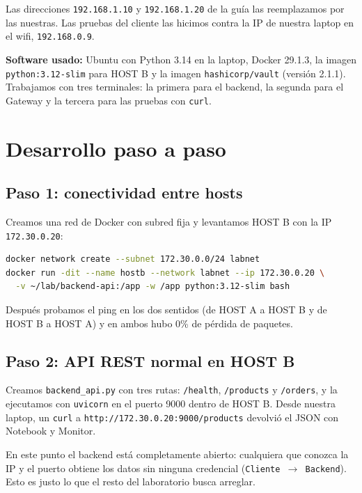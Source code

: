 \documentclass[11pt,a4paper]{article}
\begin{document}
Las direcciones \texttt{192.168.1.10} y \texttt{192.168.1.20} de la guía las reemplazamos por las nuestras. Las pruebas del cliente las hicimos contra la IP de nuestra laptop en el wifi, \texttt{192.168.0.9}.

\textbf{Software usado:} Ubuntu con Python 3.14 en la laptop, Docker 29.1.3, la imagen \texttt{python:3.12-slim} para HOST B y la imagen \texttt{hashicorp/vault} (versión 2.1.1). Trabajamos con tres terminales: la primera para el backend, la segunda para el Gateway y la tercera para las pruebas con \texttt{curl}.

\section{Desarrollo paso a paso}

\subsection{Paso 1: conectividad entre hosts}

Creamos una red de Docker con subred fija y levantamos HOST B con la IP \texttt{172.30.0.20}:

\begin{lstlisting}[language=bash]
docker network create --subnet 172.30.0.0/24 labnet
docker run -dit --name hostb --network labnet --ip 172.30.0.20 \
  -v ~/lab/backend-api:/app -w /app python:3.12-slim bash
\end{lstlisting}

Después probamos el ping en los dos sentidos (de HOST A a HOST B y de HOST B a HOST A) y en ambos hubo 0\% de pérdida de paquetes.

\subsection{Paso 2: API REST normal en HOST B}

Creamos \texttt{backend\_api.py} con tres rutas: \texttt{/health}, \texttt{/products} y \texttt{/orders}, y la ejecutamos con \texttt{uvicorn} en el puerto 9000 dentro de HOST B. Desde nuestra laptop, un \texttt{curl} a \texttt{http://172.30.0.20:9000/products} devolvió el JSON con Notebook y Monitor.

En este punto el backend está completamente abierto: cualquiera que conozca la IP y el puerto obtiene los datos sin ninguna credencial (\texttt{Cliente $\rightarrow$ Backend}). Esto es justo lo que el resto del laboratorio busca arreglar.
\end{document}
